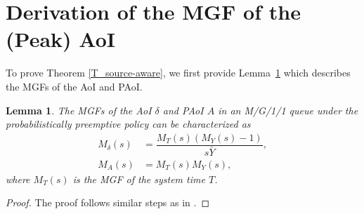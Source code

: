 \documentclass[conference]{IEEEtran}
\newtheorem{lemm}{Lemma}
\begin{document}
\section{Derivation of the MGF of the (Peak) AoI }\label{Calculation of the MGF of the AoI under the packet management policies}
To prove Theorem \ref{T_source-aware}, we first provide Lemma~\ref{lemmsmgfage} which describes the MGFs of the  AoI and PAoI.
\begin{lemm}\label{lemmsmgfage}
The MGFs of the AoI $\delta$ and PAoI $A$ in an M/G/1/1 queue under the probabilistically preemptive policy %
can be characterized as
\begin{align}\label{MGFofagegeneral}
M_{\delta}(s)&=\dfrac{M_{T}(s)(M_{Y}(s)-1)}{s\bar{Y}},\\\label{MGFpeak}
M_{A}(s)&=M_{T}(s)M_{Y}(s), 
\end{align}
where $M_{T}(s)$ is the  MGF of the system time $T$.
\end{lemm}
\begin{proof} 
The proof follows similar steps as in \cite[Lemma~1]{9869867}.
\end{proof}
\end{document}
